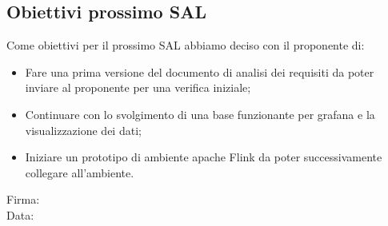 \documentclass[12pt]{article}
\begin{document}
\subsection{Obiettivi prossimo SAL}
Come obiettivi per il prossimo SAL abbiamo deciso con il proponente di:
\begin{itemize}
\item Fare una prima versione del documento di analisi dei requisiti da poter inviare al proponente per una verifica iniziale;
\item Continuare con lo svolgimento di una base funzionante per grafana e la visualizzazione dei dati;
\item Iniziare un prototipo di ambiente apache Flink da poter successivamente collegare all'ambiente.
\end{itemize}

\vfill
\begin{minipage}{10cm}
Firma: \hrulefill \\
\vspace{2mm}
Data: \dotfill
\end{minipage}
\end{document}
